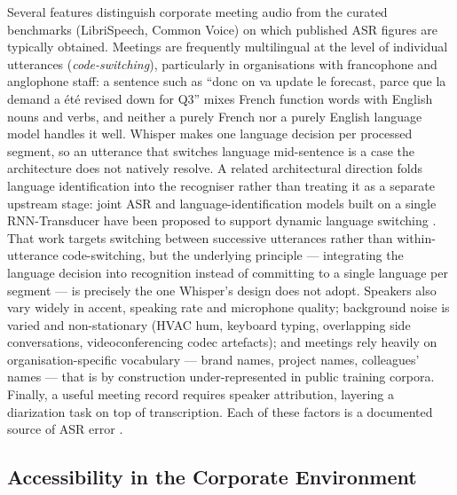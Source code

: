 \documentclass[12pt]{report}
\begin{document}
Several features distinguish corporate meeting audio from the curated benchmarks (LibriSpeech, Common Voice) on which published ASR figures are typically obtained. Meetings are frequently multilingual at the level of individual utterances (\textit{code-switching}), particularly in organisations with francophone and anglophone staff: a sentence such as \enquote{donc on va update le forecast, parce que la demand a été revised down for Q3} mixes French function words with English nouns and verbs, and neither a purely French nor a purely English language model handles it well. Whisper makes one language decision per processed segment, so an utterance that switches language mid-sentence is a case the architecture does not natively resolve. A related architectural direction folds language identification into the recogniser rather than treating it as a separate upstream stage: joint ASR and language-identification models built on a single RNN-Transducer have been proposed to support dynamic language switching \cite{punjabi2021joint}. That work targets switching between successive utterances rather than within-utterance code-switching, but the underlying principle --- integrating the language decision into recognition instead of committing to a single language per segment --- is precisely the one Whisper's design does not adopt. Speakers also vary widely in accent, speaking rate and microphone quality; background noise is varied and non-stationary (HVAC hum, keyboard typing, overlapping side conversations, videoconferencing codec artefacts); and meetings rely heavily on organisation-specific vocabulary --- brand names, project names, colleagues' names --- that is by construction under-represented in public training corpora. Finally, a useful meeting record requires speaker attribution, layering a diarization task on top of transcription. Each of these factors is a documented source of ASR error \cite{farahani2017autocorrelation,yoshioka2019advances}.

\subsection{Accessibility in the Corporate Environment}
\end{document}
